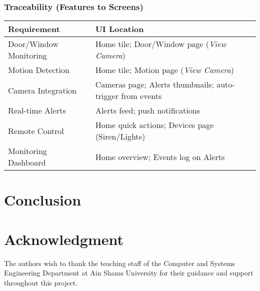 \documentclass[conference]{IEEEtran}
\begin{document}
\subsubsection{Traceability (Features to Screens)}
\begin{center}
\begin{tabularx}{\linewidth}{@{}lX@{}}
\toprule
\textbf{Requirement} & \textbf{UI Location} \\\midrule
Door/Window Monitoring & Home tile; Door/Window page (\emph{View Camera}) \\
Motion Detection & Home tile; Motion page (\emph{View Camera}) \\
Camera Integration & Cameras page; Alerts thumbnails; auto-trigger from events \\
Real-time Alerts & Alerts feed; push notifications \\
Remote Control & Home quick actions; Devices page (Siren/Lights) \\
Monitoring Dashboard & Home overview; Events log on Alerts \\
\bottomrule
\end{tabularx}
\end{center}


\section{Conclusion}


\section*{Acknowledgment}
The authors wish to thank the teaching staff of the Computer and Systems Engineering Department at Ain Shams University for their guidance and support throughout this project.




\end{document}
